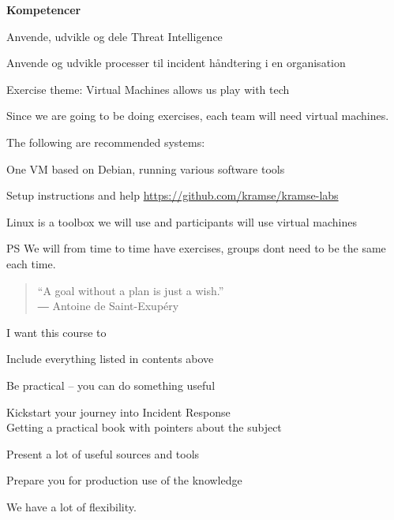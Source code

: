 \documentclass[Screen16to9,17pt]{foils}
\begin{document}
{\bf Kompetencer}
\begin{list2}
\item Anvende, udvikle og dele Threat Intelligence
\item Anvende og udvikle processer til incident håndtering i en organisation
\end{list2}




Exercise theme: Virtual Machines allows us play with tech

Since we are going to be doing exercises, each team will need virtual machines.

The following are recommended systems:
\begin{list2}
\item One VM based on Debian, running various software tools
\item Setup instructions and help \url{https://github.com/kramse/kramse-labs}
\end{list2}

Linux is a toolbox we will use and participants will use virtual machines

\vskip 1cm
PS We will from time to time have exercises, groups dont need to be the same each time.



\begin{quote}
  “A goal without a plan is just a wish.”\\
  ― Antoine de Saint-Exupéry
\end{quote}

I want this course to
\begin{list2}
\item Include everything listed in contents above
\item Be practical -- you can do something useful
\item Kickstart your journey into Incident Response\\
Getting a practical book with pointers about the subject
\item Present a lot of useful sources and tools
\item Prepare you for production use of the knowledge
\end{list2}

We have a lot of flexibility.
\end{document}
